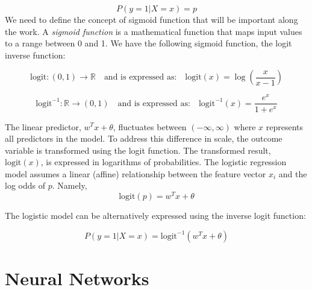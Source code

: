 \documentclass[../main.tex]{subfiles}
\begin{document}
$$P(y = 1 | X = x) = p $$
We need to define the concept of sigmoid function that will be important along the work. A \textit{sigmoid function} is a mathematical function that maps input values to a range between 0 and 1. We have the following sigmoid function, the logit inverse function:

\[
\text{logit}: (0,1) \to \mathbb{R}
\quad \text{and is expressed as:} \quad
\text{logit}(x) = \log\left(\frac{x}{x-1}\right)
\]


\[
\text{logit}^{-1}: \mathbb{R} \to (0,1)
\quad \text{and is expressed as:} \quad
\text{logit}^{-1}(x) = \frac{e^x}{1+e^x}
\]

\noindent The linear predictor, $ w^T x +\theta$, fluctuates between $(-\infty,\infty)$ where $x$ represents all predictors in the model. To address this difference in scale, the outcome variable is transformed using the logit function. The transformed result, $\text{logit}(x)$, is expressed in logarithms of probabilities. 
The logistic regression model assumes a linear (affine) relationship between the feature vector $x_i$ and the log odds of $p$. Namely,
$$\text{logit}(p) = w^T x +\theta$$

The logistic model can be alternatively expressed using the inverse logit function:

\[
P(y = 1 | X=x) = \text{logit}^{-1}(w^T x +\theta)
\]




\section{Neural Networks}
	
\end{document}
